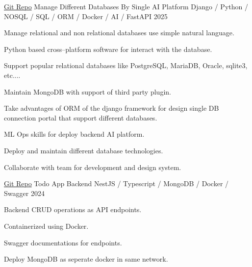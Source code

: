 

\begin{cventries}

  \cventry
    {\href{https://github.com/drsamitha/Demo_DBMS}{Git Repo}} %
    {Manage Different Databases By Single AI Platform} %
    {Django / Python / NOSQL / SQL / ORM / Docker / AI / FastAPI} %
    {2025} %
    {
      \begin{cvitems} %
        \item {Manage relational and non relational databases use simple natural language.}
        \item {Python based cross--platform software for interact with the database.}
        \item {Support popular relational databases like PostgreSQL, MariaDB, Oracle, sqlite3, etc....}
        \item {Maintain MongoDB with support of third party plugin.}
        \item {Take advantages of ORM of the django framework for design single DB connection portal that support different databases.}
        \item {ML Ops skills for deploy backend AI platform.}
        \item {Deploy and maintain different database technologies.}
        \item {Collaborate with team for development and design system.}
      \end{cvitems}
    }

  \cventry
    {\href{https://github.com/drsamitha/TodoAPI}{Git Repo}} %
    {Todo App Backend} %
    {NestJS / Typescript / MongoDB / Docker / Swagger} %
    {2024} %
    {
      \begin{cvitems} %
        \item {Backend CRUD operations as API endpoints.}
        \item {Containerized using Docker.}
        \item {Swagger documentations for endpoints.}
        \item {Deploy MongoDB as seperate docker in same network.}
      \end{cvitems}
    }
 

\end{cventries}
